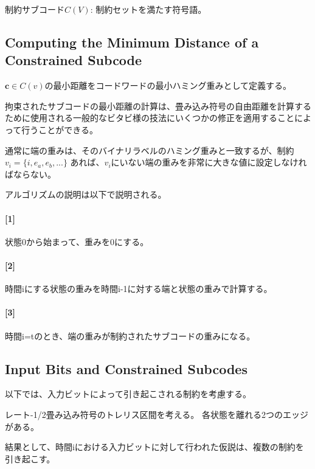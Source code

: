 \documentclass[20 pts]{article}
\begin{document}
制約サブコード$C(V)$: 制約セットを満たす符号語。


\subsection{Computing the Minimum Distance of a Constrained
Subcode}
$\mathbf{c} \in C(v)$の最小距離をコードワードの最小ハミング重みとして定義する。

拘束されたサブコードの最小距離の計算は、畳み込み符号の自由距離を計算する
ために使用される一般的なビタビ様の技法にいくつかの修正を適用することによって行うことができる。

通常に端の重みは、そのバイナリラベルのハミング重みと一致するが、制約$v_i=\{ i,e_a, e_b,...\}$
あれば、$v_i$にいない端の重みを非常に大きな値に設定しなければならない。

アルゴリズムの説明は以下で説明される。
\paragraph{[1]}状態0から始まって、重みを0にする。

\paragraph{[2]}時間iにする状態の重みを時間i-1に対する端と状態の重みで計算する。

\paragraph{[3]}時間i=tのとき、端の重みが制約されたサブコードの重みになる。


\subsection{Input Bits and Constrained Subcodes}
以下では、入力ビットによって引き起こされる制約を考慮する。

レート-1/2畳み込み符号のトレリス区間を考える。 各状態を離れる2つのエッジがある。

結果として、時間iにおける入力ビットに対して行われた仮説は、複数の制約を引き起こす。
\end{document}
